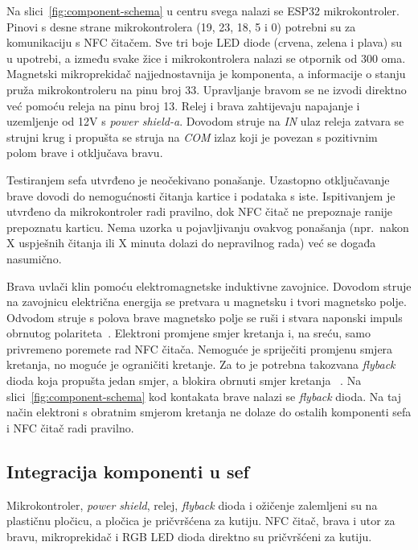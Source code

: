 Na slici~\ref{fig:component-schema} u centru svega nalazi se ESP32 mikrokontroler.
Pinovi s desne strane mikrokontrolera (19, 23, 18, 5 i 0) potrebni su za komunikaciju s NFC čitačem.
Sve tri boje LED diode (crvena, zelena i plava) su u upotrebi, a između svake žice i mikrokontrolera nalazi se
otpornik od 300 oma.
Magnetski mikroprekidač najjednostavnija je komponenta, a informacije o stanju pruža mikrokontroleru na pinu broj 33.
Upravljanje bravom se ne izvodi direktno već pomoću releja na pinu broj 13.
Relej i brava zahtijevaju napajanje i uzemljenje od 12V s \textit{power shield-a}.
Dovodom struje na \textit{IN} ulaz releja zatvara se strujni krug i propušta se struja na \textit{COM} izlaz koji je
povezan s pozitivnim polom brave i otključava bravu.

Testiranjem sefa utvrđeno je neočekivano ponašanje.
Uzastopno otključavanje brave dovodi do nemogućnosti čitanja kartice i podataka s iste.
Ispitivanjem je utvrđeno da mikrokontroler radi pravilno, dok NFC čitač ne prepoznaje ranije prepoznatu karticu.
Nema uzorka u pojavljivanju ovakvog ponašanja (npr.\ nakon X uspješnih čitanja ili X minuta dolazi do nepravilnog rada)
već se događa nasumično.

Brava uvlači klin pomoću elektromagnetske induktivne zavojnice.
Dovodom struje na zavojnicu električna energija se pretvara u magnetsku i tvori magnetsko polje.
Odvodom struje s polova brave magnetsko polje se ruši i stvara naponski impuls obrnutog polariteta~\cite{flyback-diode}.
Elektroni promjene smjer kretanja i, na sreću, samo privremeno poremete rad NFC čitača.
Nemoguće je spriječiti promjenu smjera kretanja, no moguće je ograničiti kretanje.
Za to je potrebna takozvana \textit{flyback} dioda koja propušta jedan smjer, a blokira obrnuti smjer kretanja
~\cite{flyback-diode}.
Na slici~\ref{fig:component-schema} kod kontakata brave nalazi se \textit{flyback} dioda.
Na taj način elektroni s obratnim smjerom kretanja ne dolaze do ostalih komponenti sefa i NFC čitač radi pravilno.

\subsection{Integracija komponenti u sef}

Mikrokontroler, \textit{power shield}, relej, \textit{flyback} dioda i ožičenje zalemljeni su na plastičnu pločicu,
a pločica je pričvršćena za kutiju.
NFC čitač, brava i utor za bravu, mikroprekidač i RGB LED dioda direktno su pričvršćeni za kutiju.

